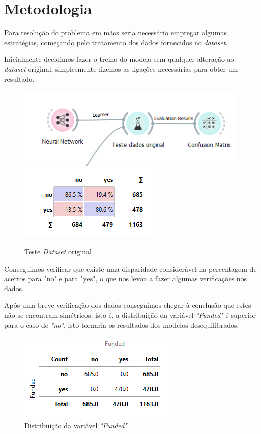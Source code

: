 \section*{Metodologia}

Para resolução do problema em mãos seria necessário empregar algumas estratégias, começando pelo tratamento dos dados fornecidos no \textit{dataset}.

Inicialmente decidimos fazer o treino do modelo sem qualquer alteração ao \textit{dataset} original, simplesmente fizemos as ligações necessárias para obter um resultado.

\begin{figure}[H]
    \centering
    \includegraphics[]{images/testeoriginal.png}
    \includegraphics[]{images/confusionmatrixoriginal.png}
     \caption{Teste \textit{Dataset} original}
\end{figure}

Conseguimos verificar que existe uma disparidade considerável na percentagem de acertos para "no" e para "yes", o que nos levou a fazer algumas verificações nos dados.

\newpage
Após uma breve verificação dos dados conseguimos chegar à conclusão que estes não se encontram simétricos, isto é, a distribuição da variável \textit{"Funded"} é superior para o caso de \textit{"no"}, isto tornaria os resultados dos modelos desequilibrados.


\begin{figure}[H]
    \centering
    \includegraphics[]{images/pivottable.png}
     \caption{Distribuição da variável \textit{"Funded"}}
\end{figure}

